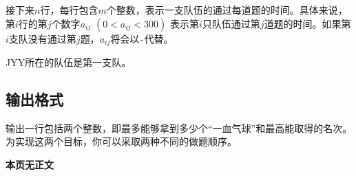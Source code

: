 接下来$n$行，每行包含$m$个整数，表示一支队伍的通过每道题的时间。具体来说，第$i$行的第$j$个数字$a_{ij}$ $(0 < a_{ij} < 300)$ 表示第$i$只队伍通过第$j$道题的时间。如果第$i$支队没有通过第$j$题，$a_{ij}$将会以\texttt{-}代替。

JYY所在的队伍是第一支队。

\subsection*{输出格式}

输出一行包括两个整数，即最多能够拿到多少个“一血气球”和最高能取得的名次。为实现这两个目标，你可以采取两种不同的做题顺序。

\ifodd\value{page}
\clearpage
\else
\fi

\setcounter{ExampleNo}{0}


\clearpage

\ifodd\value{page}
\else
    \vspace*{\fill}
    \begin{center}
    \textbf{\Large 本页无正文}
    \end{center}
    \vspace*{\fill}
    \clearpage
\fi

